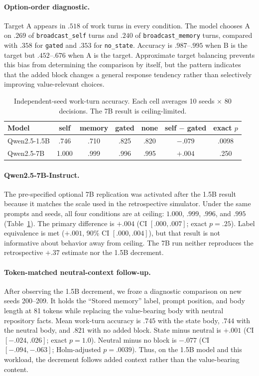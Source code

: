 \documentclass[11pt]{article}
\begin{document}
\paragraph{Option-order diagnostic.} Target A appears in $.518$ of work turns in every condition. The model chooses A on $.269$ of \texttt{broadcast\_self} turns and $.240$ of \texttt{broadcast\_memory} turns, compared with $.358$ for \texttt{gated} and $.353$ for \texttt{no\_state}. Accuracy is $.987$--$.995$ when B is the target but $.452$--$.676$ when A is the target. Approximate target balancing prevents this bias from determining the comparison by itself, but the pattern indicates that the added block changes a general response tendency rather than selectively improving value-relevant choices.

\begin{table}[t]
\centering\small
\begin{tabular}{lcccccc}
\toprule
\textbf{Model} & \textbf{self} & \textbf{memory} & \textbf{gated} & \textbf{none} & \textbf{self $-$ gated} & \textbf{exact $p$} \\
\midrule
Qwen2.5-1.5B & .746 & .710 & .825 & .820 & $-.079$ & .0098 \\
Qwen2.5-7B & 1.000 & .999 & .996 & .995 & $+.004$ & .250 \\
\bottomrule
\end{tabular}
\caption{Independent-seed work-turn accuracy. Each cell averages 10 seeds $\times$ 80 decisions. The 7B result is ceiling-limited.}
\label{tab:confirmatory}
\end{table}

\paragraph{Qwen2.5-7B-Instruct.} The pre-specified optional 7B replication was activated after the 1.5B result because it matches the scale used in the retrospective simulator. Under the same prompts and seeds, all four conditions are at ceiling: $1.000$, $.999$, $.996$, and $.995$ (Table~\ref{tab:confirmatory}). The primary difference is $+.004$ (CI $[.000,.007]$; exact $p=.25$). Label equivalence is met ($+.001$, 90\% CI $[.000,.004]$), but that result is not informative about behavior away from ceiling. The 7B run neither reproduces the retrospective $+.37$ estimate nor the 1.5B decrement.

\paragraph{Token-matched neutral-context follow-up.} After observing the 1.5B decrement, we froze a diagnostic comparison on new seeds 200--209. It holds the ``Stored memory'' label, prompt position, and body length at 81 tokens while replacing the value-bearing body with neutral repository facts. Mean work-turn accuracy is $.745$ with the state body, $.744$ with the neutral body, and $.821$ with no added block. State minus neutral is $+.001$ (CI $[-.024,.026]$; exact $p=1.0$). Neutral minus no block is $-.077$ (CI $[-.094,-.063]$; Holm-adjusted $p=.0039$). Thus, on the 1.5B model and this workload, the decrement follows added context rather than the value-bearing content.
\end{document}
